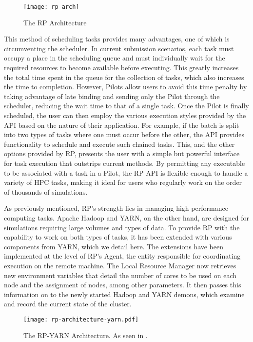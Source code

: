 \documentclass[]{article}
\begin{document}
		\begin{figure}[H]
			\centering
			\texttt{[image: rp\_arch]}
			\caption{The RP Architecture \cite{rp_arch}}
			\label{fig:rp_architecture}
		\end{figure}

		This method of scheduling tasks provides many advantages, one of which is circumventing the scheduler. In current submission scenarios, each task must occupy a place in the scheduling queue and must individually wait for the required resources to become available before executing. This greatly increases the total time spent in the queue for the collection of tasks, which also increases the time to completion. However, Pilots allow users to avoid this time penalty by taking advantage of late binding and sending only the Pilot through the scheduler, reducing the wait time to that of a single task. Once the Pilot is finally scheduled, the user can then employ the various execution styles provided by the API based on the nature of their application. For example, if the batch is split into two types of tasks where one must occur before the other, the API provides functionality to schedule and execute such chained tasks. This, and the other options provided by RP, presents the user with a simple but powerful interface for task execution that outstrips current methods. By permitting any executable to be associated with a task in a Pilot, the RP API is flexible enough to handle a variety of HPC tasks, making it ideal for users who regularly work on the order of thousands of simulations.

		As previously mentioned, RP's strength lies in managing high performance computing tasks. Apache Hadoop and YARN, on the other hand, are designed for simulations requiring large volumes and types of data. To provide RP with the capability to work on both types of tasks, it has been extended with various components from YARN, which we detail here. The extensions have been implemented at the level of RP's Agent, the entity responsible for coordinating execution on the remote machine. The Local Resource Manager now retrieves new environment variables that detail the number of cores to be used on each node and the assignment of nodes, among other parameters. It then passes this information on to the newly started Hadoop and YARN demons, which examine and record the current state of the cluster.

		\begin{figure}[H]
			\centering
			\texttt{[image: rp-architecture-yarn.pdf]}
			\caption{The RP-YARN Architecture. As seen in \cite{hadoop_paper}.}
			\label{fig:rp_yarn_arch}
		\end{figure}
\end{document}
